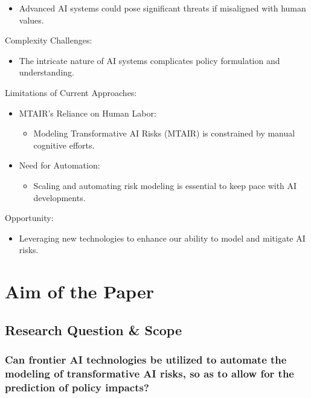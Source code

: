 \documentclass[
  letterpaper,
]{book}
\providecommand{\tightlist}{%
  \setlength{\itemsep}{0pt}\setlength{\parskip}{0pt}}
\begin{document}
\begin{itemize}
\tightlist
\item
  Advanced AI systems could pose significant threats if misaligned with
  human values.
\end{itemize}

Complexity Challenges:

\begin{itemize}
\tightlist
\item
  The intricate nature of AI systems complicates policy formulation and
  understanding.
\end{itemize}

Limitations of Current Approaches:

\begin{itemize}
\tightlist
\item
  MTAIR's Reliance on Human Labor:

  \begin{itemize}
  \tightlist
  \item
    Modeling Transformative AI Risks (MTAIR) is constrained by manual
    cognitive efforts.\\
  \end{itemize}
\item
  Need for Automation:

  \begin{itemize}
  \tightlist
  \item
    Scaling and automating risk modeling is essential to keep pace with
    AI developments.
  \end{itemize}
\end{itemize}

Opportunity:

\begin{itemize}
\tightlist
\item
  Leveraging new technologies to enhance our ability to model and
  mitigate AI risks.
\end{itemize}

\section{Aim of the Paper}\label{aim-of-the-paper}

\subsection{Research Question \& Scope}\label{research-question-scope}

\subsubsection{Can frontier AI technologies be utilized to automate the
modeling of transformative AI risks, so as to allow for the prediction
of policy
impacts?}\label{can-frontier-ai-technologies-be-utilized-to-automate-the-modeling-of-transformative-ai-risks-so-as-to-allow-for-the-prediction-of-policy-impacts}
\end{document}
